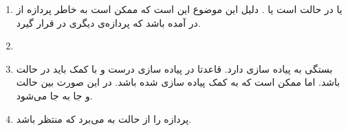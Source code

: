 \begin{enumerate}
    \item یا در حالت
     است یا .
    دلیل این موضوع این است که ممکن است به خاطر
    پردازه از
    در آمده باشد که پردازه‌ی دیگری در
    قرار گیرد.
    \item {}
    \item بستگی به پیاده سازی دارد.
    قاعدتا در پیاده سازی درست و با کمک
    باید در حالت
    باشد. اما ممکن است که به کمک
    پیاده سازی شده باشد. در این صورت بین حالت
     و 
    جا به جا می‌شود.
    \item پردازه را از حالت
     به 
    می‌برد که منتظر
    باشد.
\end{enumerate}





